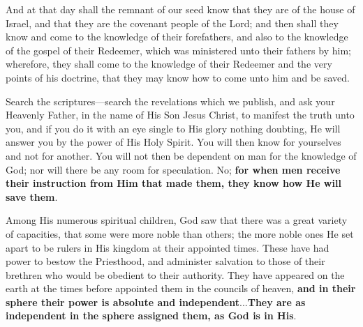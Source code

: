 		\begin{compactdesc}
		
		\item[19$\vert$]
		\begin{compactdesc}
		\item[know how to worship]%
			\begin{compactdesc}
			\item[1N 15:14] And at that day shall the remnant of our seed know that they are of the house of Israel, and that they are the covenant people of the Lord; and then shall they know and come to the knowledge of their forefathers, and also to the knowledge of the gospel of their Redeemer, which was ministered unto their fathers by him; wherefore, they shall come to the knowledge of their Redeemer and the very points of his doctrine, that they may know how to come unto him and be saved.
			\item[TPJS 11--12] Search the scriptures---search the revelations which we publish, and ask your Heavenly Father, in the name of His Son Jesus Christ, to manifest the truth unto you, and if you do it with an eye single to His glory nothing doubting, He will answer you by the power of His Holy Spirit. You will then know for yourselves and not for another. You will not then be dependent on man for the knowledge of God; nor will there be any room for speculation. No; \textbf{for when men receive their instruction from Him that made them, they know how He will save them}.
			\end{compactdesc}
		\end{compactdesc}
		
		\item[30$\vert$]
		\begin{compactdesc}
		\item[independent in that sphere]%
			\begin{compactdesc}
			\item[Orson Pratt (?), Millennial Star 18:146--147, 1856] Among His numerous spiritual children, God saw that there was a great variety of capacities, that some were more noble than others; the more noble ones He set apart to be rulers in His kingdom at their appointed times. These have had power to bestow the Priesthood, and administer salvation to those of their brethren who would be obedient to their authority. They have appeared on the earth at the times before appointed them in the councils of heaven, \textbf{and in their sphere their power is absolute and independent}...\textbf{They are as independent in the sphere assigned them, as God is in His}.
			\end{compactdesc}
		\end{compactdesc}
		

\end{compactdesc}
